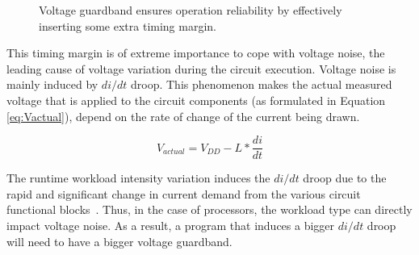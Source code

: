 \begin{figure}[!htb]
  \begin{subfigmatrix}{2}
  \end{subfigmatrix}
  \caption{Voltage guardband ensures operation reliability by effectively inserting some extra timing margin.}
  \label{fig:timming_guardband}
\end{figure}

This timing margin is of extreme importance to cope with voltage noise, the leading cause of voltage variation during the circuit execution. Voltage noise is mainly induced by $di/dt$ droop. This phenomenon makes the actual measured voltage that is  applied to the circuit components (as formulated in Equation \ref{eq:Vactual}), depend on the rate of change of the current being drawn. 

\begin{equation}
    \label{eq:Vactual}
    V_{actual} = V_{DD}-L*\frac{di}{dt}
\end{equation}

The runtime workload intensity variation induces the $di/dt$ droop due to the rapid and significant change in current demand from the various circuit functional blocks~\cite{thomas_core_2016}. Thus, in the case of processors, the workload type can directly impact voltage noise. As a result, a program that induces a bigger $di/dt$ droop will need to have a bigger voltage guardband.

